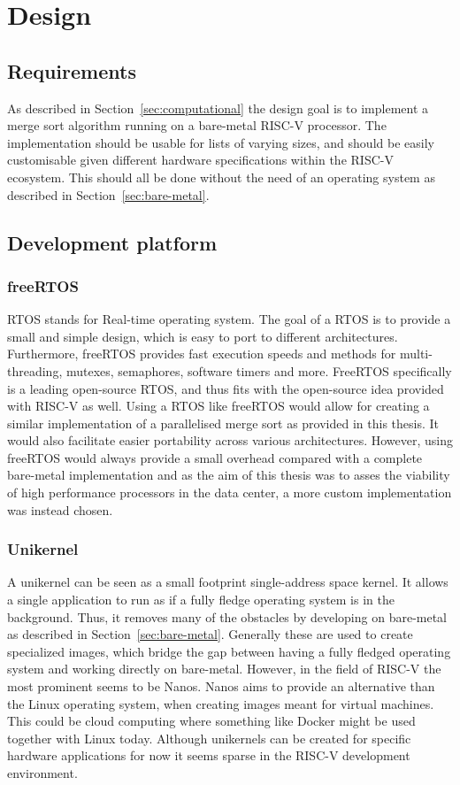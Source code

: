 \section{Design}\label{sec:Design}
\subsection{Requirements}
As described in Section~\ref{sec:computational} the design goal is to implement
a merge sort algorithm running on a bare-metal RISC-V processor. The
implementation should be usable for lists of varying sizes, and should be easily
customisable given different hardware specifications within the RISC-V
ecosystem. This should all be done without the need of an operating system as
described in Section~\ref{sec:bare-metal}.

\subsection{Development platform}
\subsubsection{freeRTOS}
RTOS stands for Real-time operating system. The goal of a RTOS is to provide a
small and simple design, which is easy to port to different architectures.
Furthermore, freeRTOS provides fast execution speeds and methods for
multi-threading, mutexes, semaphores, software timers and more. FreeRTOS
specifically is a leading open-source RTOS, and thus fits with the open-source
idea provided with RISC-V as well. Using a RTOS like freeRTOS would allow for
creating a similar implementation of a parallelised merge sort as provided in
this thesis. It would also facilitate easier portability across various
architectures. However, using freeRTOS would always provide a small overhead
compared with a complete bare-metal implementation and as the aim of this thesis
was to asses the viability of high performance processors in the data center, a
more custom implementation was instead chosen.

\subsubsection{Unikernel}
A unikernel can be seen as a small footprint single-address space kernel. It
allows a single application to run as if a fully fledge operating system is in
the background. Thus, it removes many of the obstacles by developing on
bare-metal as described in Section~\ref{sec:bare-metal}. Generally these are
used to create specialized images, which bridge the gap between having a fully
fledged operating system and working directly on bare-metal. However, in the
field of RISC-V the most prominent seems to be Nanos. Nanos aims to provide an
alternative than the Linux operating system, when creating images meant for
virtual machines. This could be cloud computing where something like Docker
might be used together with Linux today. Although unikernels can be created for
specific hardware applications for now it seems sparse in the RISC-V
development environment.

